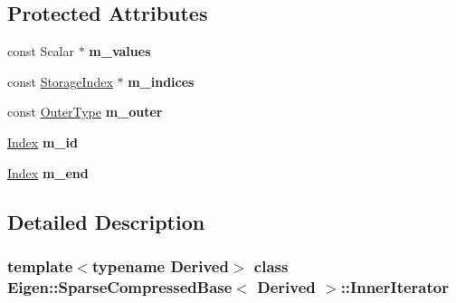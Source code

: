 \subsection*{Protected Attributes}
\begin{DoxyCompactItemize}
\item 
\mbox{\label{class_eigen_1_1_sparse_compressed_base_1_1_inner_iterator_ae55cec0044beb07477fcdbc5dd60ffd3}} 
const Scalar $\ast$ {\bfseries m\+\_\+values}
\item 
\mbox{\label{class_eigen_1_1_sparse_compressed_base_1_1_inner_iterator_afda890dbfd2a077ca6313be7473c581c}} 
const \hyperlink{group___sparse_core___module_a0b540ba724726ebe953f8c0df06081ed}{Storage\+Index} $\ast$ {\bfseries m\+\_\+indices}
\item 
\mbox{\label{class_eigen_1_1_sparse_compressed_base_1_1_inner_iterator_a35be608b4ccded40a8c6aede6a151cee}} 
const \hyperlink{class_eigen_1_1internal_1_1variable__if__dynamic}{Outer\+Type} {\bfseries m\+\_\+outer}
\item 
\mbox{\label{class_eigen_1_1_sparse_compressed_base_1_1_inner_iterator_a53a38206a6d4dd249aab44e344862a04}} 
\hyperlink{group___core___module_a554f30542cc2316add4b1ea0a492ff02}{Index} {\bfseries m\+\_\+id}
\item 
\mbox{\label{class_eigen_1_1_sparse_compressed_base_1_1_inner_iterator_a1f64c8c86a04eaa0bc0309a2a7dc841c}} 
\hyperlink{group___core___module_a554f30542cc2316add4b1ea0a492ff02}{Index} {\bfseries m\+\_\+end}
\end{DoxyCompactItemize}


\subsection{Detailed Description}
\subsubsection*{template$<$typename Derived$>$\newline
class Eigen\+::\+Sparse\+Compressed\+Base$<$ Derived $>$\+::\+Inner\+Iterator}



